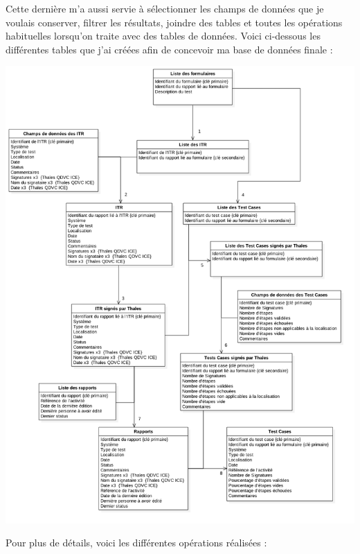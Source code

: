 Cette dernière m'a aussi servie à sélectionner les champs de données que je voulais conserver, filtrer les résultats, joindre des tables et toutes les opérations habituelles lorsqu'on traite avec des tables de données.
Voici ci-dessous les différentes tables que j'ai créées afin de concevoir ma base de données finale :
\newpage
\begin{center}
\includegraphics[scale=0.5]{ressources/images/figures/bd.png}
\end{center}
\newpage
Pour plus de détails, voici les différentes opérations réalisées :
